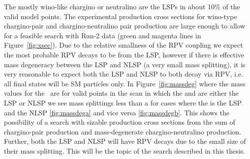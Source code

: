 The mostly wino-like chargino or neutralino are the LSPs in about 10\% of the valid model points.
The experimental production cross sections for wino-type chargino-pair and chargino-neutralino pair production are large enough to allow for a feasible search with Run-2 data (green and magenta lines in Figure~\ref{fig:xsec}).
Due to the relative smallness of the RPV coupling we expect the most probable RPV decays to be from the LSP, however if there is effective mass degeneracy between the LSP and NLSP (a very small mass splitting), it is very reasonable to expect both the LSP and NLSP to both decay via RPV, i.e. all final states will be SM particles only. 
In Figure~\ref{fig:massdeg} where the mass values for the \chono\ are for valid points in the scan in which the \none and \chonemp are either the LSP or NLSP we see mass splittings less than a \gev for cases where the \none is the LSP and \chonepm the NLSP \ref{fig:massdega} and vice versa \ref{fig:massdegb}.
This shows the possibility of a search with sizable production cross sections from the sum of chargino-pair production and mass-degenerate chargino-neutralino production.  Further, both the LSP and NLSP will have RPV decays due to the small size of their mass splitting.
This will be the topic of the search described in this thesis.

